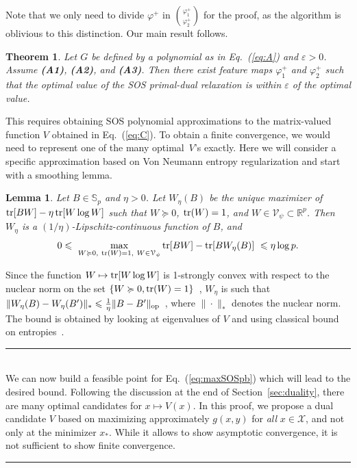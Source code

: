 \documentclass[11pt]{article}
\newcommand{\BEAS}{\begin{eqnarray*}}
\newcommand{\EEAS}{\end{eqnarray*}}
\newcommand{\tr}{\mathop{ \rm tr}}
\newcommand{\rb}{\mathbb{R}}
\newcommand{\BlackBox}{\rule{1.5ex}{1.5ex}}  %
\newenvironment{proof}{\par\noindent{\bf Proof\ }}{\hfill\BlackBox\\[2mm]}
\newtheorem{lemma}{Lemma}
\newtheorem{theorem}{Theorem}
\newcommand{\mysec}[1]{Section~\ref{sec:#1}}
\newcommand{\eq}[1]{Eq.~(\ref{eq:#1})}
\def \X{{\mathcal X}}
\begin{document}
Note that we only need to divide $\varphi^+$ in ${\varphi^+_1 \choose \varphi^+_2}$ for the proof, as the algorithm is oblivious to this distinction. Our main result follows.
\begin{theorem}
Let $G$ be defined by a polynomial as in \eq{A} and $\varepsilon > 0$. Assume \textbf{(A1)},   \textbf{(A2)}, and  \textbf{(A3)}. Then there exist feature maps $\varphi^+_1$ and $\varphi^+_2$ such that the optimal value of the SOS primal-dual relaxation is within $\varepsilon$ of the optimal value.
\end{theorem}
\begin{proof}
This requires obtaining SOS polynomial approximations to the matrix-valued function $V$ obtained in \eq{C}. To obtain a finite convergence, we would need to represent one of the many optimal~$V$'s exactly. Here we will consider a specific approximation based on Von Neumann entropy regularization and start with a smoothing lemma.
\begin{lemma}
\label{lemma:smoothing}
Let $B \in \mathbb{S}_p$ and $\eta>0$. Let $W_\eta(B)$ be the unique maximizer of $\tr[ BW ] - \eta \tr [ W \log W  ]$ such that $W \succcurlyeq 0$, $ \tr(W)=1$, and $W \in \mathcal{V}_\psi \subset \rb^p $. Then $W_\eta$ is a $(1/\eta)$-Lipschitz-continuous function of $B$, and
\[
0 \leqslant  \ \max_{W \succcurlyeq 0, \ \tr(W) = 1, \ W \in \mathcal{V}_\psi}
\tr[ BW ]  - \tr[ BW_\eta(B)]  \ \leqslant \eta \log p.
\]
\end{lemma}
\begin{proof}
Since the function $W\mapsto \tr [ W \log W]$ is 1-strongly convex with respect to the nuclear norm on the set $\{ W \succcurlyeq 0, \tr(W) = 1\}$~\cite{yu2013strong}, $W_\eta$ is such that $\| W_\eta(B) - W_\eta(B') \|_\ast \leqslant \frac{1}{\eta} \| B - B'\|_{\rm op}$~\cite{lemarechal1997practical}, where $\| \cdot \|_\ast$ denotes the nuclear norm. The bound is obtained by looking at eigenvalues of $V$ and using classical bound on entropies~\cite{cover1999elements}.
\end{proof}
We can now build a feasible point for \eq{maxSOSpb} which will lead to the desired bound. Following the discussion at the end of \mysec{duality}, there are many optimal candidates for $x \mapsto V(x)$. In this proof, we propose a dual candidate $V$ based on maximizing approximately $g(x,y)$ for \emph{all} $x \in \X$, and not only at the minimizer $x_\ast$. While it allows to show asymptotic convergence, it is not sufficient to show finite convergence.



\end{proof}
\end{document}
